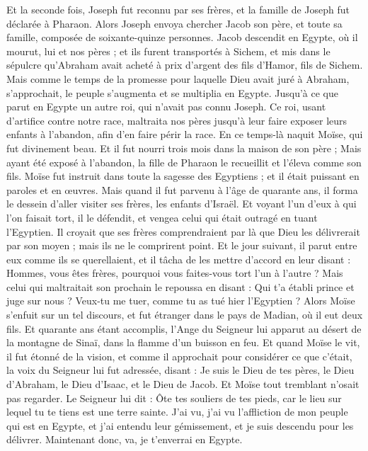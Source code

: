 \begin{multicols}{2}
Et la seconde fois, Joseph fut reconnu par ses frères, et la famille de Joseph fut déclarée à Pharaon.
Alors Joseph envoya chercher Jacob son père, et toute sa famille, composée de soixante-quinze personnes.
Jacob descendit en Egypte, où il mourut, lui et nos pères ;
et ils furent transportés à Sichem, et mis dans le sépulcre qu'Abraham avait acheté à prix d'argent des fils d’Hamor, fils de Sichem.
Mais comme le temps de la promesse pour laquelle Dieu avait juré à Abraham, s’approchait, le peuple s’augmenta et se multiplia en Egypte.
Jusqu'à ce que parut en Egypte un autre roi, qui n'avait pas connu Joseph.
Ce roi, usant d’artifice contre notre race, maltraita nos pères jusqu'à leur faire exposer leurs enfants à l'abandon, afin d'en faire périr la race.
En ce temps-là naquit Moïse, qui fut divinement beau. Et il fut nourri trois mois dans la maison de son père ;
Mais ayant été exposé à l’abandon, la fille de Pharaon le recueillit et l’éleva comme son fils.
Moïse fut instruit dans toute la sagesse des Egyptiens ; et il était puissant en paroles et en œuvres.
Mais quand il fut parvenu à l’âge de quarante ans, il forma le dessein d’aller visiter ses frères, les enfants d’Israël.
Et voyant l’un d’eux à qui l’on faisait tort, il le défendit, et vengea celui qui était outragé en tuant l'Egyptien.
Il croyait que ses frères comprendraient par là que Dieu les délivrerait par son moyen ; mais ils ne le comprirent point.
Et le jour suivant, il parut entre eux comme ils se querellaient, et il tâcha de les mettre d'accord en leur disant : Hommes, vous êtes frères, pourquoi vous faites-vous tort l'un à l'autre ?
Mais celui qui maltraitait son prochain le repoussa en disant : Qui t'a établi prince et juge sur nous ?
Veux-tu me tuer, comme tu as tué hier l'Egyptien ?
Alors Moïse s’enfuit sur un tel discours, et fut étranger dans le pays de Madian, où il eut deux fils.
Et quarante ans étant accomplis, l'Ange du Seigneur lui apparut au désert de la montagne de Sinaï, dans la flamme d’un buisson en feu.
Et quand Moïse le vit, il fut étonné de la vision, et comme il approchait pour considérer ce que c'était, la voix du Seigneur lui fut adressée,
disant : Je suis le Dieu de tes pères, le Dieu d'Abraham, le Dieu d'Isaac, et le Dieu de Jacob. Et Moïse tout tremblant n'osait pas regarder.
Le Seigneur lui dit : Ôte tes souliers de tes pieds, car le lieu sur lequel tu te tiens est une terre sainte.
J’ai vu, j’ai vu l'affliction de mon peuple qui est en Egypte, et j'ai entendu leur gémissement, et je suis descendu pour les délivrer. Maintenant donc, va, je t'enverrai en Egypte.

\end{multicols}
